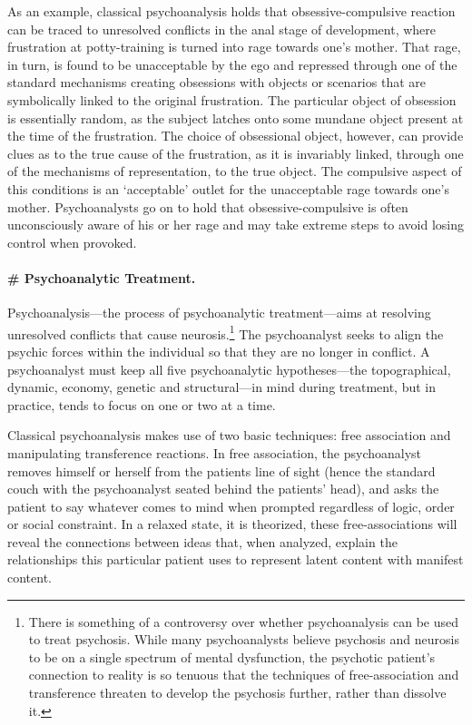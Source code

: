 As an example, classical psychoanalysis holds that obsessive-compulsive reaction can be traced to unresolved conflicts in the anal stage of development, where frustration at potty-training is turned into rage towards one's mother. That rage, in turn, is found to be unacceptable by the ego and repressed through one of the standard mechanisms creating obsessions with objects or scenarios that are symbolically linked to the original frustration. The particular object of obsession is essentially random, as the subject latches onto some mundane object present at the time of the frustration. The choice of obsessional object, however, can provide clues as to the true cause of the frustration, as it is invariably linked, through one of the mechanisms of representation, to the true object. The compulsive aspect of this conditions is an `acceptable' outlet for the unacceptable rage towards one's mother. Psychoanalysts go on to hold that obsessive-compulsive is often unconsciously aware of his or her rage and may take extreme steps to avoid losing control when provoked. 

\paragraph{\# Psychoanalytic Treatment.}
\label{psychoanalytictreatment.}

Psychoanalysis—the process of psychoanalytic treatment—aims at resolving unresolved conflicts that cause neurosis.\footnote{There is something of a controversy over whether psychoanalysis can be used to treat psychosis. While many psychoanalysts believe psychosis and neurosis to be on a single spectrum of mental dysfunction, the psychotic patient's connection to reality is so tenuous that the techniques of free-association and transference threaten to develop the psychosis further, rather than dissolve it.} The psychoanalyst seeks to align the psychic forces within the individual so that they are no longer in conflict. A psychoanalyst must keep all five psychoanalytic hypotheses—the topographical, dynamic, economy, genetic and structural—in mind during treatment, but in practice, tends to focus on one or two at a time. 

Classical psychoanalysis makes use of two basic techniques: free association and manipulating transference reactions. In free association, the psychoanalyst removes himself or herself from the patients line of sight (hence the standard couch with the psychoanalyst seated behind the patients' head), and asks the patient to say whatever comes to mind when prompted regardless of logic, order or social constraint. In a relaxed state, it is theorized, these free-associations will reveal the connections between ideas that, when analyzed, explain the relationships this particular patient uses to represent latent content with manifest content.

